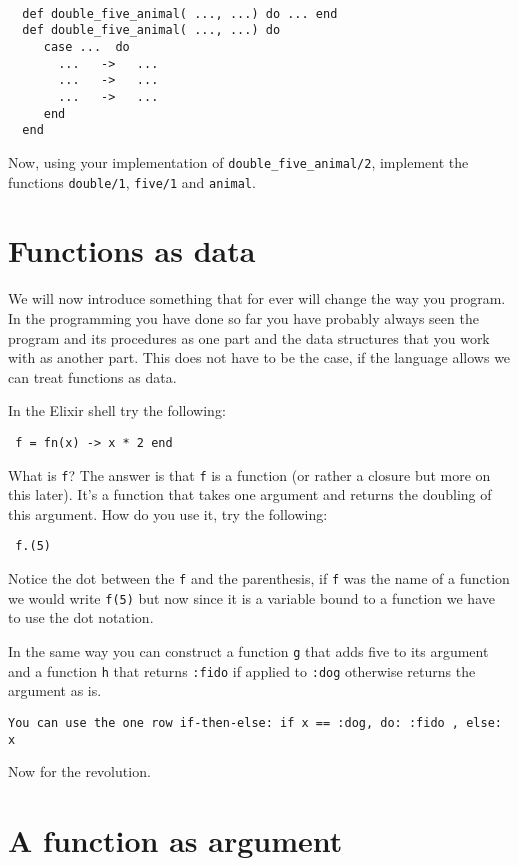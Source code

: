 \documentclass[a4paper,11pt]{article}
\begin{document}
\begin{verbatim}

  def double_five_animal( ..., ...) do ... end
  def double_five_animal( ..., ...) do 
     case ...  do 
       ...   ->   ...
       ...   ->   ...     
       ...   ->   ...
     end
  end  
\end{verbatim}

Now, using your implementation of {\tt double\_five\_animal/2},
implement the functions {\tt double/1}, {\tt five/1} and {\tt animal}.


\section*{Functions as data}

We will now introduce something that for ever will change the way you
program. In the programming you have done so far you have probably
always seen the program and its procedures as one part and the data
structures that you work with as another part. This does not have to be
the case, if the language allows we can treat functions as data.


In the Elixir shell try the following:

\begin{verbatim}
 f = fn(x) -> x * 2 end
\end{verbatim}

What is {\tt f}?  The answer is that {\tt f} is a function (or rather
a closure but more on this later). It's a function that takes one
argument and returns the doubling of this argument. How do you use it, try the following:

\begin{verbatim}
 f.(5)
\end{verbatim}

Notice the dot between the {\tt f} and the parenthesis, if {\tt f} was
the name of a function we would write {\tt f(5)} but now since it is a
variable bound to a function we have to use the dot notation. 

In the same way you can construct a function {\tt g} that adds five to
its argument and a function {\tt h} that returns {\tt :fido} if
applied to {\tt :dog} otherwise returns the argument as is.

{\tt You can use the one row if-then-else:  {\tt if  x == :dog, do: :fido , else: x}}

Now for the revolution.

\section*{A function as argument}
\end{document}
